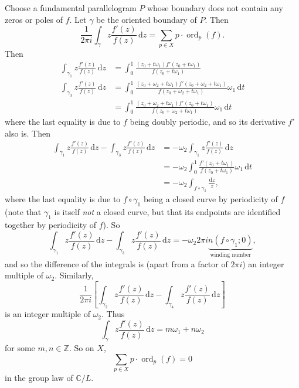 \documentclass[12pt]{article}
\newcommand{\z}{\mathbb{Z}}
\newcommand{\cx}{\mathbb{C}}
\newcommand{\ita}[1]{\textit{#1}}
\theoremstyle{definition}
\theoremstyle{remark}
\DeclareMathOperator\ord{ord}
\begin{document}
Choose a fundamental parallelogram $P$ whose boundary does not contain any zeros or poles of $f$. Let $\gamma$ be the oriented boundary of $P$. Then 
\begin{equation}
    \frac{1}{2\pi i}\int_{\gamma} z \frac{f'(z)}{f(z)} \,\mathrm{d}z = \sum\limits_{p \in X} p \cdot \ord_p(f).
\end{equation}
Then 
\begin{equation}
    \begin{split}
        \int_{\gamma_1} z \frac{f'(z)}{f(z)} \,\mathrm{d} z & = \int_0^1 \frac{(z_0 + t \omega_1) f'(z_0 + t \omega_1)}{f(z_0 + t \omega_1)} \\ 
        \int_{\gamma_3} z \frac{f'(z)}{f(z)} \,\mathrm{d} z & = \int_0^1 \frac{(z_0 + \omega_2 + t \omega_1)f'(z_0 + \omega_2 + t \omega_1)}{f(z_0 + \omega_2 + t \omega_1)} \omega_1 \,\mathrm{d}t \\
        & = \int_0^1 \frac{(z_0 + \omega_2 + t \omega_1)f'(z_0 + t \omega_1)}{f(z_0 + \omega_2 + t \omega_1)} \omega_1 \, \mathrm{d}t
    \end{split}
\end{equation}
where the last equality is due to $f$ being doubly periodic, and so its derivative $f'$ also is. Then 
\begin{equation}
    \begin{split}
        \int_{\gamma_1} z \frac{f'(z)}{f(z)} \, \mathrm{d} z - \int_{\gamma_3} z \frac{f'(z)}{f(z)} \,\mathrm{d} z & = -\omega_2 \int_{\gamma_1} z \frac{f'(z)}{f(z)} \,\mathrm{d} z \\
        & = -\omega_2 \int_0^1 \frac{f'(z_0 + t \omega_1)}{f(z_0 + t \omega_1)} \omega_1 \,\mathrm{d} t \\
        & = -\omega_2 \int_{f \circ \gamma_1} \frac{\mathrm{d} z}{z},
    \end{split}
\end{equation}
where the last equality is due to $f \circ \gamma_1$ being a closed curve by periodicity of $f$ (note that $\gamma_1$ is itself \ita{not} a closed curve, but that its endpoints are identified together by periodicity of $f$). So 
\begin{equation}
    \int_{\gamma_1} z \frac{f'(z)}{f(z)} \,\mathrm{d} z - \int_{\gamma_3} z \frac{f'(z)}{f(z)} \,\mathrm{d} z = -\omega_2 2\pi i \underbrace{n(f \circ \gamma_1 ; 0)}_{\text{winding number}},
\end{equation}
and so the difference of the integrals is (apart from a factor of $2 \pi i$) an integer multiple of $\omega_2$. Similarly,
\begin{equation}
    \frac{1}{2 \pi i} \left[ \int_{\gamma_2} z \frac{f'(z)}{f(z)} \,\mathrm{d} z - \int_{\gamma_4} z \frac{f'(z)}{f(z)} \,\mathrm{d} z \right]
\end{equation}
is an integer multiple of $\omega_2$. Thus 
\begin{equation}
    \int_{\gamma} z \frac{f'(z)}{f(z)} \,\mathrm{d} z = m \omega_1 + n \omega_2
\end{equation}
for some $m , n \in \z$. So on $X$, 
\begin{equation}
    \sum\limits_{p \in X} p \cdot \ord_p (f) = 0
\end{equation}
in the group law of $\cx / L$.
\end{document}
